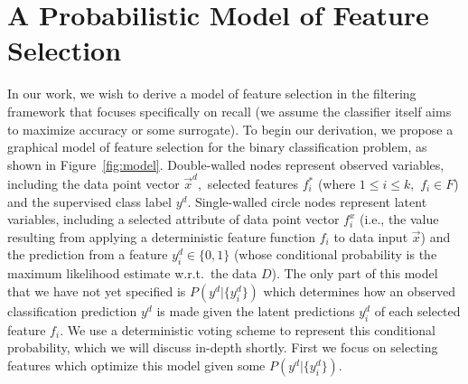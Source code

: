 \section{A Probabilistic Model of Feature Selection}

%


In our work, we wish to derive a model of feature selection in the
filtering framework that focuses specifically on recall (we assume the
classifier itself aims to maximize accuracy or some surrogate).  To
begin our derivation, we propose a graphical model of feature
selection for the binary classification problem, as shown in
Figure~\ref{fig:model}. Double-walled nodes represent observed
variables, including the data point vector $\vec{x}^{d},$ selected
features $f_i^*$ (where $1\leq i\leq k,$ $f_i\in F$) and the
supervised class label $y^d$. Single-walled circle nodes represent
latent variables, including a selected attribute of data
point vector $f_i^x$ (i.e., the value resulting from applying
a deterministic feature function $f_i$ to data input $\vec{x}$) and
the prediction from a feature $y^d_i \in \{0,1\}$ (whose conditional
probability is the maximum likelihood estimate w.r.t.\ the data $D$).
The only part of this model that we have not yet specified is 
$P(y^d|\{y^d_i\})$ which determines how an observed classification 
prediction $y^d$ is made given the latent predictions $y^d_i$ of each 
selected feature $f_i$.  We use a deterministic voting scheme
to represent this conditional probability, which we will discuss
in-depth shortly.  First we focus on selecting features which optimize
this model given some $P(y^d|\{y^d_i\})$.

